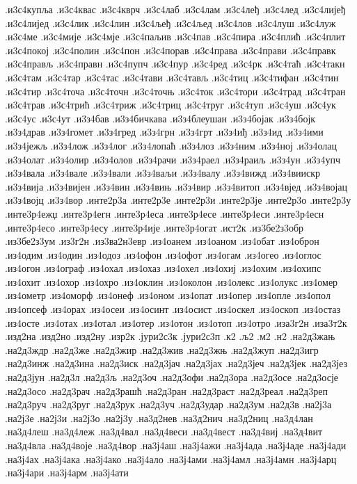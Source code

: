 {.и3с4купља
.и3с4квас
.и3с4кврч
.и3с4лаб
.и3с4лам
.и3с4леђ
.и3с4лед
.и3с4лијеђ
.и3с4лијед
.и3с4лик
.и3с4лин
.и3с4љеђ
.и3с4љед
.и3с4лов
.и3с4луш
.и3с4луж
.и3с4ме
.и3с4мије
.и3с4мје
.и3с4паљив
.и3с4пав
.и3с4пира
.и3с4плић
.и3с4плит
.и3с4покој
.и3с4полин
.и3с4пон
.и3с4порав
.и3с4права
.и3с4прави
.и3с4правк
.и3с4прављ
.и3с4правн
.и3с4пупч
.и3с4пур
.и3с4ред
.и3с4рк
.и3с4таћ
.и3с4такн
.и3с4там
.и3с4тар
.и3с4тас
.и3с4тави
.и3с4тављ
.и3с4тиц
.и3с4тифан
.и3с4тин
.и3с4тир
.и3с4точа
.и3с4точн
.и3с4точњ
.и3с4ток
.и3с4тори
.и3с4трад
.и3с4тран
.и3с4трав
.и3с4трић
.и3с4триж
.и3с4триц
.и3с4труг
.и3с4туп
.и3с4уш
.и3с4ук
.и3с4ус
.и3с4ут
.и3з4бав
.и3з4бичкава
.и3з4блеушан
.и3з4бојак
.и3з4бојк
.и3з4драв
.и3з4гомет
.и3з4гред
.и3з4грн
.и3з4грт
.и3з4иђ
.и3з4ид
.и3з4ими
.и3з4јежљ
.и3з4лож
.и3з4лог
.и3з4лопаћ
.и3з4лоз
.и3з4ним
.и3з4ној
.и3з4олац
.и3з4олат
.и3з4олир
.и3з4олов
.и3з4рачи
.и3з4раел
.и3з4раиљ
.и3з4ун
.и3з4упч
.и3з4вала
.и3з4вале
.и3з4вали
.и3з4ваљи
.и3з4валу
.и3з4вижд
.и3з4виискр
.и3з4вија
.и3з4вијен
.и3з4вин
.и3з4вињ
.и3з4вир
.и3з4витоп
.и3з4вјед
.и3з4војац
.и3з4војц
.и3з4вор
.инте2р3а
.инте2р3е
.инте2р3и
.инте2р3је
.инте2р3о
.инте2р3у
.инте3р4ежџ
.инте3р4егн
.инте3р4еса
.инте3р4есе
.инте3р4еси
.инте3р4есн
.инте3р4есо
.инте3р4есу
.инте3р4ије
.инте3р4огат
.ист2к
.из3бе2з3обр
.из3бе2з3ум
.из3г2н
.из3ва2н3евр
.из4оанем
.из4оаном
.из4обат
.из4оброн
.из4одим
.из4один
.из4одоз
.из4офон
.из4офот
.из4огам
.из4огео
.из4оглос
.из4огон
.из4ограф
.из4охал
.из4охаз
.из4охел
.из4охиј
.из4охим
.из4охипс
.из4охит
.из4охор
.из4охро
.из4оклин
.из4околон
.из4олекс
.из4олукс
.из4омер
.из4ометр
.из4оморф
.из4онеф
.из4оном
.из4опат
.из4опер
.из4опле
.из4опол
.из4опсеф
.из4орах
.из4осеи
.из4осинт
.из4осист
.из4оскел
.из4оскоп
.из4остаз
.из4осте
.из4отах
.из4отал
.из4отер
.из4отон
.из4отоп
.из4отро
.иза3г2н
.иза3т2к
.изд2на
.изд2но
.изд2ну
.изр2к
.јури2с3к
.јури2с3п
.к2
.љ2
.м2
.н2
.на2д3жањ
.на2д3ждр
.на2д3же
.на2д3жир
.на2д3жив
.на2д3жњ
.на2д3жуп
.на2д3игр
.на2д3инж
.на2д3ина
.на2д3иск
.на2д3јач
.на2д3јах
.на2д3јеч
.на2д3јек
.на2д3јез
.на2д3јун
.на2д3л
.на2д3љ
.на2д3оч
.на2д3офи
.на2д3ора
.на2д3осе
.на2д3осје
.на2д3осо
.на2д3рач
.на2д3рашћ
.на2д3ран
.на2д3раст
.на2д3реал
.на2д3реп
.на2д3руч
.на2д3руг
.на2д3рук
.на2д3уч
.на2д3удар
.на2д3ум
.на2д3в
.на2ј3а
.на2ј3е
.на2ј3и
.на2ј3о
.на2ј3у
.на3д2нев
.на3д2нич
.на3д2ниц
.на3д4лан
.на3д4леш
.на3д4леж
.на3д4вал
.на3д4веси
.на3д4вест
.на3д4виј
.на3д4вит
.на3д4вла
.на3д4воје
.на3д4вор
.на3ј4аш
.на3ј4ажи
.на3ј4ада
.на3ј4аде
.на3ј4ади
.на3ј4ах
.на3ј4ака
.на3ј4ако
.на3ј4ало
.на3ј4ами
.на3ј4амл
.на3ј4амн
.на3ј4арц
.на3ј4ари
.на3ј4арм
.на3ј4ати
}
